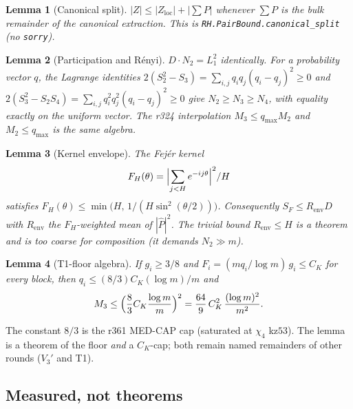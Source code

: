 \documentclass[11pt]{article}
\newtheorem{lemma}{Lemma}
\theoremstyle{remark}
\newcommand{\loc}{\mathrm{loc}}
\begin{document}
\begin{lemma}[Canonical split]\label{lem:split}
$|Z|\le|Z_{\loc}|+|\sum P|$ whenever $\sum P$ is the bulk
remainder of the canonical extraction.  This is
\texttt{RH.PairBound.canonical\_split} (no \texttt{sorry}).
\end{lemma}

\begin{lemma}[Participation and R\'enyi]\label{lem:renyi}
$D\cdot N_2=L_1^2$ identically.  For a probability vector $q$,
the Lagrange identities
$2(S_2^2-S_3)=\sum_{i,j}q_i q_j(q_i-q_j)^2\ge 0$ and
$2(S_3^2-S_2 S_4)=\sum_{i,j}q_i^2 q_j^2(q_i-q_j)^2\ge 0$
give $N_2\ge N_3\ge N_4$, with equality exactly on the uniform
vector.  The r324 interpolation $M_3\le q_{\max} M_2$ and
$M_2\le q_{\max}$ is the same algebra.
\end{lemma}

\begin{lemma}[Kernel envelope]\label{lem:env}
The Fej\'er kernel
\[
  F_H(\theta)
  =\Bigl|\sum_{j<H}e^{-ij\theta}\Bigr|^2/H
\]
satisfies
$F_H(\theta)\le\min\bigl(H,\,1/(H\sin^2(\theta/2))\bigr)$.
Consequently $S_F\le R_{\mathrm{env}} D$ with $R_{\mathrm{env}}$
the $F_H$-weighted mean of $|\widehat P|^2$.  The trivial bound
$R_{\mathrm{env}}\le H$ is a theorem and is too coarse for
composition (it demands $N_2\gg m$).
\end{lemma}

\begin{lemma}[T1-floor algebra]\label{lem:t1alg}
If $g_i\ge 3/8$ and $F_i=(m q_i/\log m)\,g_i\le C_K$ for every
block, then $q_i\le(8/3)C_K(\log m)/m$ and
\[
  M_3
  \le\Bigl(\frac83 C_K\frac{\log m}{m}\Bigr)^2
  =\frac{64}{9}\,C_K^2\,\frac{(\log m)^2}{m^2}.
\]
\end{lemma}

\noindent
The constant $8/3$ is the r361 MED-CAP cap (saturated at
$\chi_4$ kz$53$).  The lemma is a theorem of the floor
\emph{and} a $C_K$-cap; both remain named remainders of other
rounds ($V_3'$ and T1).

\subsection*{Measured, not theorems}
\end{document}

